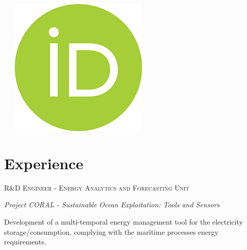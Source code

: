\documentclass{mycv}
\begin{document}
\begin{center}
	\ \ \
	\href{https://orcid.org/0000-0001-8170-8235}{\includegraphics[scale=0.05]{figs/orcid_logo.png}}

\end{center}


\section{Experience}
\textsc{R\&D Engineer - Energy Analytics and Forecasting Unit}

\begin{myitemize}
	\item \textit{Project CORAL - Sustainable Ocean Exploitation: Tools and Sensors}
	
	Development of a multi-temporal energy management tool for the electricity
	storage/consumption, complying with the maritime processes energy
	requirements.
	
	
\end{myitemize}


\end{document}
